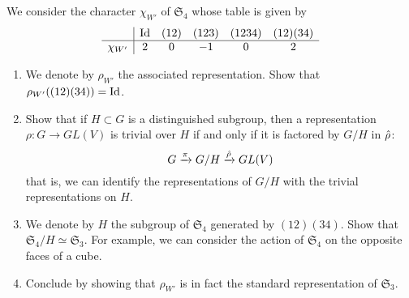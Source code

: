  
\begin{exo}
\label{exo-caracteres-s4}
 
   We consider the character $ \chi_{W'} $ of $ \mathfrak{S}_4 $ whose table is given by
\begin{equation*}
\begin{array}{c | ccccc} & \operatorname{Id} & (12) & (123) & (1234) & (12) (34) \\\hline \chi_{W'} & 2 & 0 & -1 & 0 & 2 \end{array}
\end{equation*}
\begin{enumerate}
\item We denote by $ \rho_{W'} $ the associated representation. Show that $ \rho_{W'} ((12) (34)) = \operatorname{Id} $.
\item {}  Show that if $ H \subset G $ is a distinguished subgroup, then a representation $ \rho: G \rightarrow GL (V) $ is trivial over $ H $ if and only if it is factored by $ G / H $ in $ \hat{\rho} $:
\begin{equation*}
G \xrightarrow{\pi} G / H \xrightarrow{\hat{\rho}} GL (V)
\end{equation*}
that is, we can identify the representations of $ G / H $ with the trivial representations on $ H $.
\item We denote by $ H $ the subgroup of $ \mathfrak{S}_4 $ generated by $ (12) (34) $. Show that $ \mathfrak{S}_4 / H \simeq \mathfrak{S}_3 $. For example, we can consider the action of $ \mathfrak{S}_4 $ on the opposite faces of a cube.
\item {} Conclude by showing that $ \rho_{W'} $ is in fact the standard representation of $ \mathfrak{S}_3 $.
\end{enumerate}
\end{exo}
 
